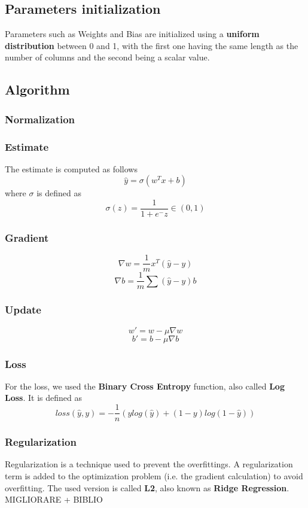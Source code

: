 \documentclass[
	letterpaper, %
	10pt, %
]{class}
\begin{document}
\subsection{Parameters initialization}
Parameters such as Weights and Bias are initialized using a \textbf{uniform distribution} between 0 and 1, with the first one having the same length as the number of columns and the second being a scalar value.

\subsection{Algorithm}

\subsubsection{Normalization}

\subsubsection{Estimate}
The estimate is computed as follows
$$ \hat{y} = \sigma(w^Tx + b) $$
where $\sigma$ is defined as
$$ \sigma(z) = \frac{1}{1 + e^-z} \in (0,1) $$

\subsubsection{Gradient}

$$ \nabla w = \frac{1}{m}x^T(\hat{y} - y) $$
$$\nabla b = \frac{1}{m}\sum(\hat{y} - y) b $$

\subsubsection{Update}


$$ w' = w - \mu \nabla w $$
$$ b' = b - \mu \nabla b $$

\subsubsection{Loss}
For the loss, we used the \textbf{Binary Cross Entropy} function, also called \textbf{Log Loss}.
It is defined as
$$ loss(\hat{y}, y) = -\frac{1}{n}(y log(\hat{y}) + (1-y)log(1-\hat{y})) $$

\subsubsection{Regularization}
Regularization is a technique used to prevent the overfittings. A regularization term is added to the optimization problem (i.e. the gradient calculation) to avoid overfitting.
The used version is called \textbf{L2}, also known as \textbf{Ridge Regression}. MIGLIORARE + BIBLIO\\
\end{document}
